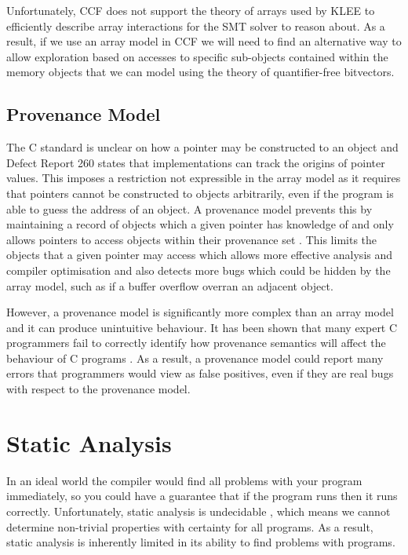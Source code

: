 \documentclass[12pt,twoside]{report}
\begin{document}
Unfortunately, CCF does not support the theory of arrays used by KLEE to efficiently describe array interactions for the SMT solver to reason about. As a result, if we use an array model in CCF we will need to find an alternative way to allow exploration based on accesses to specific sub-objects contained within the memory objects that we can model using the theory of quantifier-free bitvectors.


\subsection{Provenance Model}
The C standard is unclear on how a pointer may be constructed to an object \cite{memarian2019exploring} and Defect Report 260 \cite{defectreport260} states that implementations can track the origins of pointer values. This imposes a restriction not expressible in the array model as it requires that pointers cannot be constructed to objects arbitrarily, even if the program is able to guess the address of an object. A provenance model prevents this by maintaining a record of objects which a given pointer has knowledge of and only allows pointers to access objects within their provenance set \cite{memarian2019exploring}. This limits the objects that a given pointer may access which allows more effective analysis and compiler optimisation and also detects more bugs which could be hidden by the array model, such as if a buffer overflow overran an adjacent object.

However, a provenance model is significantly more complex than an array model and it can produce unintuitive behaviour. It has been shown that many expert C programmers fail to correctly identify how provenance semantics will affect the behaviour of C programs \cite{can't find the reference for this}. As a result, a provenance model could report many errors that programmers would view as false positives, even if they are real bugs with respect to the provenance model.

\section{Static Analysis}
In an ideal world the compiler would find all problems with your program immediately, so you could have a guarantee that if the program runs then it runs correctly. Unfortunately, static analysis is undecidable \cite{10.1145/161494.161501}, which means we cannot determine non-trivial properties with certainty for all programs. As a result, static analysis is inherently limited in its ability to find problems with programs.
\end{document}
